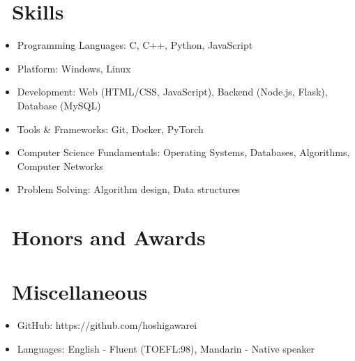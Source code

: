 \documentclass{resume}
\begin{document}
\section{\faCogs\ Skills}
\begin{itemize}[parsep=0.5ex]
  \item Programming Languages: C, C++, Python, JavaScript
  \item Platform: Windows, Linux
  \item Development: Web (HTML/CSS, JavaScript), Backend (Node.js, Flask), Database (MySQL)
  \item Tools & Frameworks: Git, Docker, PyTorch
  \item Computer Science Fundamentals: Operating Systems, Databases, Algorithms, Computer Networks
  \item Problem Solving: Algorithm design, Data structures
\end{itemize}

\section{\faHeartO\ Honors and Awards}

\section{\faInfo\ Miscellaneous}
\begin{itemize}[parsep=0.5ex]
  \item GitHub: https://github.com/hoshigawarei
  \item Languages: English - Fluent (TOEFL:98), Mandarin - Native speaker
\end{itemize}

%
%
\end{document}
